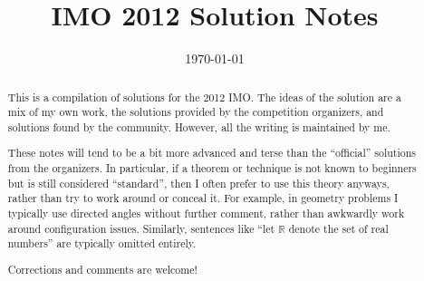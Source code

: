 \documentclass[11pt]{scrartcl}
\title{IMO 2012 Solution Notes}
\date{\today}
\begin{document}
\maketitle

\begin{abstract}
This is a compilation of solutions
for the 2012 IMO.
The ideas of the solution are a mix of my own work,
the solutions provided by the competition organizers,
and solutions found by the community.
However, all the writing is maintained by me.

These notes will tend to be a bit more advanced and terse than the ``official''
solutions from the organizers.
In particular, if a theorem or technique is not known to beginners
but is still considered ``standard'', then I often prefer to
use this theory anyways, rather than try to work around or conceal it.
For example, in geometry problems I typically use directed angles
without further comment, rather than awkwardly work around configuration issues.
Similarly, sentences like ``let $\mathbb{R}$ denote the set of real numbers''
are typically omitted entirely.

Corrections and comments are welcome!
\end{abstract}

\tableofcontents
\newpage

\addtocounter{section}{-1}
\end{document}
